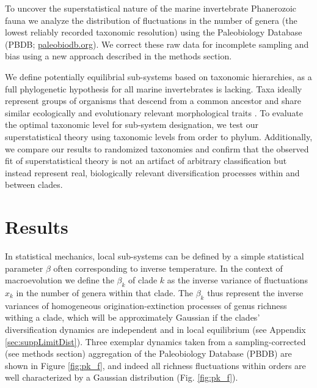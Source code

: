 \documentclass[12pt]{article}
\let\citep=\cite
\begin{document}
To uncover the superstatistical nature of the marine invertebrate
Phanerozoic fauna we analyze the distribution of fluctuations in the
number of genera (the lowest reliably recorded taxonomic resolution)
using the Paleobiology Database (PBDB; \url{paleobiodb.org}). We
correct these raw data for incomplete sampling and bias using a new
approach described in the methods section.

We define potentially equilibrial sub-systems based on taxonomic
hierarchies, as a full phylogenetic hypothesis for all marine
invertebrates is lacking.  Taxa ideally represent groups of organisms
that descend from a common ancestor and share similar ecologically and
evolutionary relevant morphological traits \citep{mayr1965systZool,
  erwin2007}. To evaluate the optimal taxonomic level for sub-system
designation, we test our superstatistical theory using taxonomic
levels from order to phylum. Additionally, we compare our results to
randomized taxonomies and confirm that the observed fit of
superstatistical theory is not an artifact of arbitrary classification
but instead represent real, biologically relevant diversification
processes within and between clades.

\section*{Results}

In statistical mechanics, local sub-systems can be defined by a simple
statistical parameter $\beta$ often corresponding to inverse
temperature. In the context of macroevolution we define the $\beta_k$
of clade $k$ as the inverse variance of fluctuations $x_k$ in the
number of genera within that clade.  The $\beta_k$ thus represent the
inverse variances of homogeneous origination-extinction processes of
genus richness withing a clade, which will be approximately Gaussian
if the clades' diversification dynamics are independent and in local
equilibrium (see Appendix \ref{sec:suppLimitDist}).  Three exemplar
dynamics taken from a sampling-corrected (see methods section)
aggregation of the Paleobiology Database (PBDB) \citep{alroy08} are
shown in Figure \ref{fig:pk_f}, and indeed all richness fluctuations
within orders are well characterized by a Gaussian distribution
(Fig. \ref{fig:pk_f}).
\end{document}
